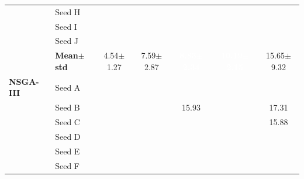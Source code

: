 \begin{table}[H]
{\begin{tabular}{@{}llccccc@{}}
  & Seed H & \cellcolor{RoyalBlue!10}{\small 3.99} & \cellcolor{RoyalBlue!10}{\small 5.35} & \cellcolor{RoyalBlue!10}{\small 7.40} & \cellcolor{RoyalBlue!10}{\small 9.07} & \cellcolor{RoyalBlue!10}{\small 10.54} \\
  & Seed I & \cellcolor{RoyalBlue!10}{\small 4.62} & \cellcolor{RoyalBlue!10}{\small 5.01} & \cellcolor{RoyalBlue!10}{\small 7.90} & \cellcolor{RoyalBlue!10}{\small 8.96} & \cellcolor{RoyalBlue!10}{\small 10.21} \\
  & Seed J & \cellcolor{RoyalBlue!10}{\small 3.91} & \cellcolor{RoyalBlue!10}{\small 5.57} & \cellcolor{RoyalBlue!10}{\small 7.80} & \cellcolor{RoyalBlue!10}{\small 10.53} & \cellcolor{RoyalBlue!10}{\small 10.75} \\
 & \textbf{Mean$\pm$std} & \cellcolor{RoyalBlue!20}4.54$\pm$1.27 & \cellcolor{RoyalBlue!20}7.59$\pm$2.87 & \cellcolor{RoyalBlue!65}\textcolor{white}{\textbf{8.83$\pm$2.34}} & \cellcolor{RoyalBlue!65}\textcolor{white}{\textbf{10.19$\pm$2.15}} & \cellcolor{red!12}15.65$\pm$9.32 \\
\midrule
 \textbf{NSGA-III} & Seed A & \cellcolor{RoyalBlue!10}{\small 3.54} & \cellcolor{RoyalBlue!10}{\small 5.97} & \cellcolor{RoyalBlue!10}{\small 12.58} & \cellcolor{RoyalBlue!10}{\small 10.22} & \cellcolor{RoyalBlue!10}{\small 11.93} \\
  & Seed B & \cellcolor{RoyalBlue!10}{\small 5.82} & \cellcolor{RoyalBlue!10}{\small 11.31} & {\small\color{gray!60!black}15.93} & \cellcolor{RoyalBlue!10}{\small 14.53} & {\small\color{gray!60!black}17.31} \\
  & Seed C & \cellcolor{RoyalBlue!10}{\small 6.62} & \cellcolor{RoyalBlue!10}{\small 11.14} & \cellcolor{RoyalBlue!10}{\small 10.43} & \cellcolor{RoyalBlue!10}{\small 13.36} & {\small\color{gray!60!black}15.88} \\
  & Seed D & \cellcolor{RoyalBlue!10}{\small 4.40} & \cellcolor{RoyalBlue!10}{\small 5.90} & \cellcolor{RoyalBlue!10}{\small 7.08} & \cellcolor{RoyalBlue!10}{\small 9.36} & \cellcolor{RoyalBlue!10}{\small 10.81} \\
  & Seed E & \cellcolor{RoyalBlue!10}{\small 4.93} & \cellcolor{RoyalBlue!10}{\small 7.07} & \cellcolor{RoyalBlue!10}{\small 7.07} & \cellcolor{RoyalBlue!10}{\small 8.67} & \cellcolor{RoyalBlue!10}{\small 11.61} \\
  & Seed F & \cellcolor{RoyalBlue!10}{\small 3.74} & \cellcolor{RoyalBlue!10}{\small 6.66} & \cellcolor{RoyalBlue!10}{\small 7.55} & \cellcolor{RoyalBlue!10}{\small 9.80} & \cellcolor{RoyalBlue!10}{\small 11.17} \\

\end{tabular}}
\end{table}
